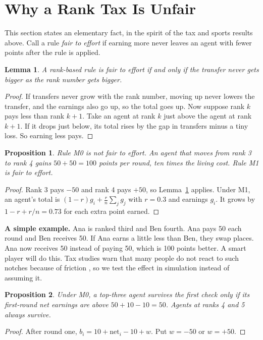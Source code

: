 \documentclass[conference]{IEEEtran}
\theoremstyle{plain}
\newtheorem{lemma}{Lemma}
\newtheorem{proposition}{Proposition}
\begin{document}
\section{Why a Rank Tax Is Unfair}
\label{sec:theory}
This section states an elementary fact, in the spirit of the tax and sports results above. Call a rule \emph{fair to effort} if earning more never leaves an agent with fewer points after the rule is applied.

\begin{lemma}\label{lem:fair}
A rank-based rule is fair to effort if and only if the transfer never gets bigger as the rank number gets bigger.
\end{lemma}
\begin{proof}
If transfers never grow with the rank number, moving up never lowers the transfer, and the earnings also go up, so the total goes up. Now suppose rank $k$ pays less than rank $k+1$. Take an agent at rank $k$ just above the agent at rank $k+1$. If it drops just below, its total rises by the gap in transfers minus a tiny loss. So earning less pays.
\end{proof}

\begin{proposition}\label{prop:sandbag}
Rule M0 is not fair to effort. An agent that moves from rank 3 to rank 4 gains $50+50=100$ points per round, ten times the living cost. Rule M1 is fair to effort.
\end{proposition}
\begin{proof}
Rank 3 pays $-50$ and rank 4 pays $+50$, so Lemma~\ref{lem:fair} applies. Under M1, an agent's total is $(1-r)g_i+\tfrac{r}{n}\sum_j g_j$ with $r=0.3$ and earnings $g_i$. It grows by $1-r+r/n=0.73$ for each extra point earned.
\end{proof}

\textbf{A simple example.} Ana is ranked third and Ben fourth. Ana pays 50 each round and Ben receives 50. If Ana earns a little less than Ben, they swap places. Ana now receives 50 instead of paying 50, which is 100 points better. A smart player will do this. Tax studies warn that many people do not react to such notches because of friction \cite{kleven2013notches}, so we test the effect in simulation instead of assuming it.

\begin{proposition}\label{prop:first}
Under M0, a top-three agent survives the first check only if its first-round net earnings are above $50+10-10=50$. Agents at ranks 4 and 5 always survive.
\end{proposition}
\begin{proof}
After round one, $b_i=10+\text{net}_i-10+w$. Put $w=-50$ or $w=+50$.
\end{proof}
\end{document}
